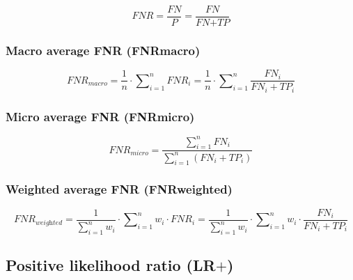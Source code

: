 \documentclass{article}
\begin{document}
\begin{equation}
    \textit{FNR} = \dfrac{\textit{FN}}{\textit{P}} = \dfrac{\textit{FN}}{\textit{FN} + \textit{TP}}
%
    \label{equation:FNR}
\end{equation}


\subsubsection{Macro average FNR (FNRmacro)}

\begin{equation}
    \textit{FNR}_\textit{macro} = \dfrac{1}{n} \cdot \sum\nolimits_{i = 1}^n \textit{FNR}_i = \dfrac{1}{n} \cdot \sum\nolimits_{i = 1}^n \dfrac{\textit{FN}_i}{\textit{FN}_i + \textit{TP}_i}
%
    \label{equation:MAAFNR}
\end{equation}


\subsubsection{Micro average FNR (FNRmicro)}

\begin{equation}
    \textit{FNR}_\textit{micro} = \dfrac{\sum\nolimits_{i = 1}^n \textit{FN}_i}{\sum\nolimits_{i = 1}^n (\textit{FN}_i + \textit{TP}_i)}
%
    \label{equation:MIAFNR}
\end{equation}


\subsubsection{Weighted average FNR (FNRweighted)}
\begin{equation}
    \textit{FNR}_\textit{weighted} = \dfrac{1}{\sum\nolimits_{i = 1}^n w_i} \cdot \sum\nolimits_{i = 1}^n w_i \cdot \textit{FNR}_i = \dfrac{1}{\sum\nolimits_{i = 1}^n w_i} \cdot \sum\nolimits_{i = 1}^n w_i \cdot \dfrac{\textit{FN}_i}{\textit{FN}_i + \textit{TP}_i}
%
    \label{equation:WAFNR}
\end{equation}


\subsection[Positive likelihood ratio (LR+)]{Positive likelihood ratio (LR$+$) \cite{swets1973relative, deeks2004diagnostic}}
\end{document}
